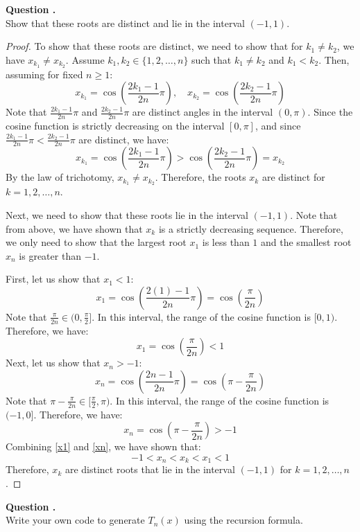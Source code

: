 \documentclass[12pt]{article}
\newcounter{question}
\newcounter{subquest}
\newcommand{\subquestion}{
    \stepcounter{subquest} 
    \vspace{.5em}
    \textbf{\large Question \thequestion.\thesubquest}
    \vspace{.25em}\ \\}
\begin{document}
\newpage
\subquestion
Show that these roots are distinct and lie in the interval $(-1,1)$.

\begin{proof}
    To show that these roots are distinct, we need to show that for $k_1 \neq k_2$, we have $x_{k_1} \neq x_{k_2}$. Assume $k_1, k_2 \in \{1, 2, \dots, n\}$ such that $k_1 \neq k_2$ and $k_1 < k_2$. Then, assuming for fixed $n\geq 1$:
    \[x_{k_1} = \cos\left(\frac{2k_1-1}{2n} \pi\right), \quad 
    x_{k_2} = \cos\left(\frac{2k_2-1}{2n} \pi\right)\]
    Note that $\frac{2k_1-1}{2n} \pi$ and $\frac{2k_2-1}{2n} \pi$ are distinct angles in the interval $(0, \pi)$.
    Since the cosine function is strictly decreasing on the interval    $[0, \pi]$, and since $\frac{2k_1-1}{2n} \pi < \frac{2k_2-1}{2n} \pi$ are distinct, we have:
    \[x_{k_1} = \cos\left(\frac{2k_1-1}{2n} \pi\right) > \cos\left(\frac{2k_2-1}{2n} \pi\right) = x_{k_2}\]
    By the law of trichotomy, $x_{k_1} \neq x_{k_2}$. Therefore, the roots $x_k$ are distinct for $k=1, 2, \dots, n$.

    Next, we need to show that these roots lie in the interval $(-1,1)$. Note that from above, we have shown that ${x_k}$ is a strictly decreasing sequence. Therefore, we only need to show that the largest root $x_1$ is less than $1$ and the smallest root $x_n$ is greater than $-1$.

    First, let us show that $x_1 < 1$:
    \[x_1 = \cos\left(\frac{2(1)-1}{2n} \pi\right) = \cos\left(\frac{\pi}{2n}\right)\]
    Note that $\frac{\pi}{2n} \in (0, \frac{\pi}{2}]$. In this interval, the range of the cosine function is $[0,1)$. Therefore, we have:
    \[x_1 = \cos\left(\frac{\pi}{2n}\right) < 1 \label{x1}\tag{1}\]   
    Next, let us show that $x_n > -1$:
    \[x_n = \cos\left(\frac{2n-1}{2n} \pi\right) = \cos\left(\pi - \frac{\pi}{2n}\right)\]
    Note that $\pi - \frac{\pi}{2n} \in [\frac{\pi}{2}, \pi)$. In this interval, the range of the cosine function is $(-1, 0]$. Therefore, we have:
    \[x_n = \cos\left(\pi - \frac{\pi}{2n}\right) > -1 \label{xn}\tag{2}\]
    Combining \eqref{x1} and \eqref{xn}, we have shown that:
    \[-1 < x_n < x_k < x_1 < 1\]
    Therefore, $x_k$ are distinct roots that lie in the interval $(-1,1)$ for $k=1, 2, \dots, n$.
\end{proof}

\newpage
\subquestion
Write your own code to generate $T_n(x)$ using the recursion formula.
\end{document}
